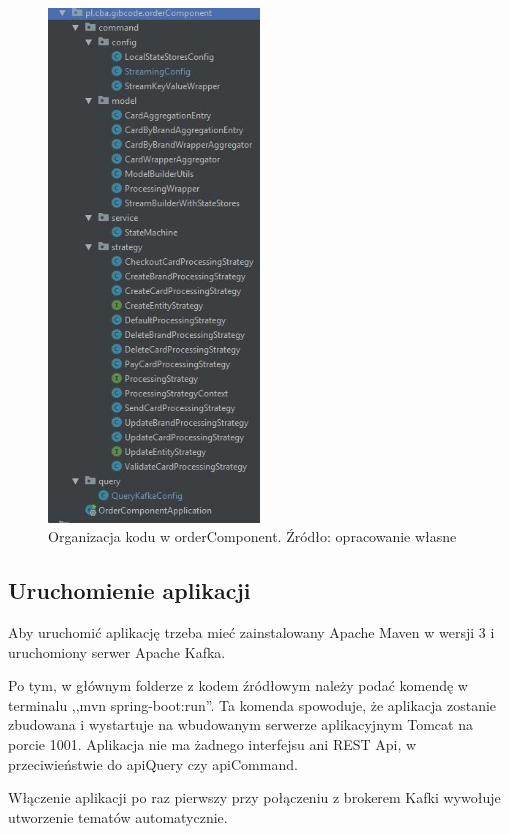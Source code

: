\begin{figure}[h!]
  \centering
    \includegraphics[width=0.5\textwidth]{images/orderComponent_packages.JPG}
  \caption{Organizacja kodu w orderComponent. Źródło: opracowanie własne }
\end{figure}
\FloatBarrier

\subsection{Uruchomienie aplikacji}
Aby uruchomić aplikację trzeba mieć zainstalowany Apache Maven w wersji 3 i uruchomiony serwer Apache Kafka.

Po tym, w głównym folderze z kodem źródłowym należy podać komendę w terminalu ,,mvn spring-boot:run''. Ta komenda spowoduje, że aplikacja zostanie zbudowana i wystartuje na wbudowanym serwerze aplikacyjnym Tomcat na porcie 1001.
Aplikacja nie ma żadnego interfejsu ani REST Api, w przeciwieństwie do apiQuery czy apiCommand.

Włączenie aplikacji po raz pierwszy przy połączeniu z brokerem Kafki wywołuje utworzenie tematów automatycznie.

